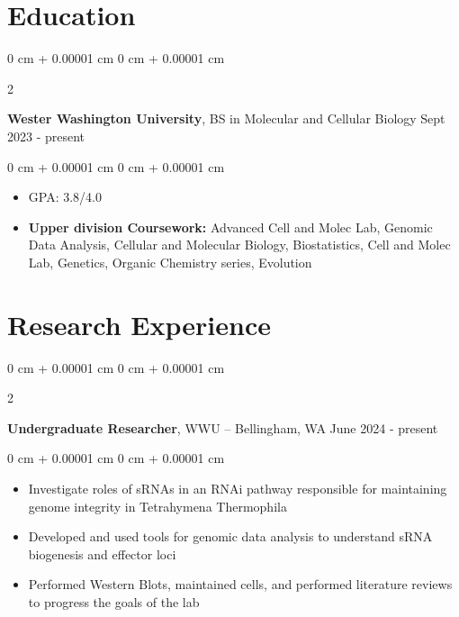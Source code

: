 \documentclass[10pt, letterpaper]{article}
\newenvironment{highlights}{
    \begin{itemize}[
        topsep=0.10 cm,
        parsep=0.10 cm,
        partopsep=0pt,
        itemsep=0pt,
        leftmargin=0 cm + 10pt
    ]
}{
    \end{itemize}
} %
\newenvironment{onecolentry}{
    \begin{adjustwidth}{
        0 cm + 0.00001 cm
    }{
        0 cm + 0.00001 cm
    }
}{
    \end{adjustwidth}
} %
\newenvironment{twocolentry}[2][]{
    \onecolentry
    \def\secondColumn{#2}
    \setcolumnwidth{\fill, 4.5 cm}
    \begin{paracol}{2}
}{
    \switchcolumn \raggedleft \secondColumn
    \end{paracol}
    \endonecolentry
} %
\begin{document}
    \section{Education}




        \begin{twocolentry}{
            Sept 2023 - present
        }
            \textbf{Wester Washington University}, BS in Molecular and Cellular Biology \end{twocolentry}

        \vspace{0.10 cm}
        \begin{onecolentry}
            \begin{highlights}
                \item GPA: 3.8/4.0 %
                \item \textbf{Upper division Coursework:} Advanced Cell and Molec Lab, Genomic Data Analysis, Cellular and Molecular Biology, Biostatistics, Cell and Molec Lab, Genetics, Organic Chemistry series, Evolution
            \end{highlights}
        \end{onecolentry}




    \section{Research Experience}




        \begin{twocolentry}{
            June 2024 - present
        }
            \textbf{Undergraduate Researcher}, WWU -- Bellingham, WA\end{twocolentry}

        \vspace{0.10 cm}
        \begin{onecolentry}
            \begin{highlights}
              \item Investigate roles of sRNAs in an RNAi pathway responsible for maintaining genome integrity in Tetrahymena Thermophila
                \item Developed and used tools for genomic data analysis to understand sRNA biogenesis and effector loci
                \item Performed Western Blots, maintained cells, and performed literature reviews to progress the goals of the lab
            \end{highlights}
        \end{onecolentry}
\end{document}
